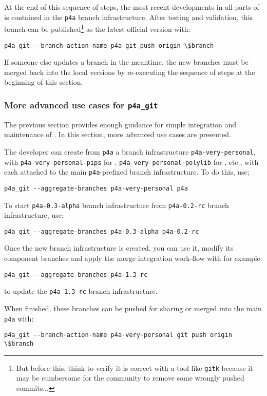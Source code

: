 \documentclass[a4paper]{article}
\begin{document}
At the end of this sequence of steps, the most recent developments in all
parts of \Apfa is contained in the \verb|p4a| branch infrastructure.
After testing and validation, this branch can be published\footnote{But
  before this, think to verify it is correct with a tool like
  \texttt{gitk} because it may be cumbersome for the community to remove
  some wrongly pushed commits...}  as the latest official version with:
\begin{verbatim}
p4a_git --branch-action-name p4a git push origin \$branch
\end{verbatim}
If someone else updates a branch in the meantime, the new branches
must be merged back into the local versions by re-executing the sequence
of steps at the beginning of this section.


\subsubsection{More advanced use cases for \protect\texttt{p4a\_git}}
\label{sec:more-advanced-use}

The previous section provides enough guidance for simple integration
and maintenance of \Apfa. In this section, more advanced use cases are
presented.

The developer can create from \texttt{p4a} a branch infrastructure
\verb|p4a-very-personal|, with \verb|p4a-very-personal-pips| for
\Apips, \verb|p4a-very-personal-polylib| for \Apolylib, etc.,
with each attached to the main \verb|p4a|-prefixed branch
infrastructure. To do this, use;
\begin{verbatim}
p4a_git --aggregate-branches p4a-very-personal p4a
\end{verbatim}

To start \texttt{p4a-0.3-alpha} branch infrastructure from
\texttt{p4a-0.2-rc} branch infrastructure, use:
\begin{verbatim}
p4a_git --aggregate-branches p4a-0.3-alpha p4a-0.2-rc
\end{verbatim}

Once the new branch infrastructure is created, you can use it, modify its
component branches and apply the merge integration work-flow with for example:
\begin{verbatim}
p4a_git --aggregate-branches p4a-1.3-rc
\end{verbatim}
to update the \texttt{p4a-1.3-rc} branch infrastructure.

When finished, these branches can be pushed for sharing or merged
into the main \Apfa \texttt{p4a} with:
\begin{verbatim}
p4a_git --branch-action-name p4a-very-personal git push origin \$branch
\end{verbatim}
\end{document}
